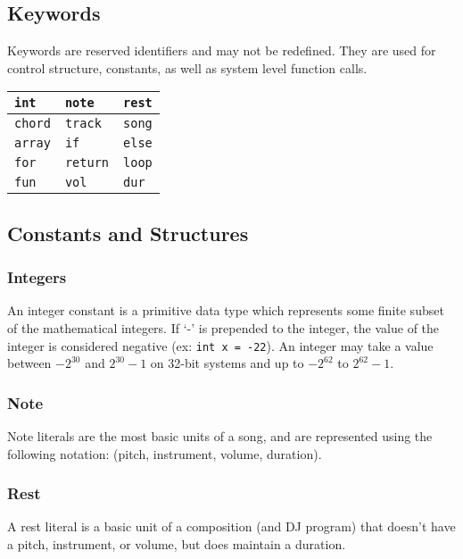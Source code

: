 \documentclass[letterpaper]{article}
\begin{document}
\begin{samepage}
\subsection{Keywords}
Keywords are reserved identifiers and may not be redefined. They are used for control structure, constants, as well as system level function calls.
\begin{table}[H]
\centering
\begin{tabularx}{.75\textwidth}{|X|X|X|}
\hline
\texttt{int} & \texttt{note} & \texttt{rest} \\
\hline
\texttt{chord} & \texttt{track} & \texttt{song} \\
\hline
\texttt{array} & \texttt{if} & \texttt{else} \\
\hline
\texttt{for} & \texttt{return} & \texttt{loop} \\
\hline
\texttt{fun} & \texttt{vol} & \texttt{dur} \\
\hline
\end{tabularx}
\end{table}
\end{samepage}

\subsection{Constants and Structures}
\subsubsection{Integers}
An integer constant is a primitive data type which represents some finite subset of the mathematical integers. If `-' is prepended to the integer, the value of the integer is considered negative (ex: \texttt{int x = -22}). An integer may take a value between $-2^{30}$ and $2^{30}-1$ on 32-bit systems and up to $-2^{62}$ to $2^{62}-1$. %
\subsubsection{Note}
Note literals are the most basic units of a song, and are represented using the following notation: (pitch, instrument, volume, duration).
\subsubsection{Rest}
A rest literal is a basic unit of a composition (and DJ program) that doesn't have a pitch, instrument, or volume, but does maintain a duration.
\end{document}
